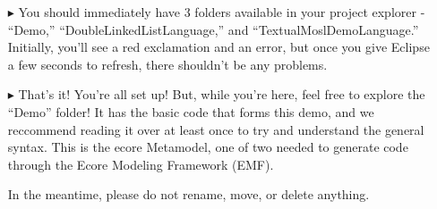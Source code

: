 \newpage
\texHeader

\begin{itemize}
\FloatBarrier
\item[$\blacktriangleright$] You should immediately have 3 folders available in your project explorer - ``Demo,'' ``DoubleLinkedListLanguage,'' and ``TextualMoslDemoLanguage.'' Initially, you'll see a red exclamation and an error, but once you give Eclipse a few seconds to refresh, there shouldn't be any problems.

\item[$\blacktriangleright$] That's it! You're all set up! But, while you're here, feel free to explore the ``Demo'' folder! It has the basic code that forms this demo, and we reccommend reading it over at least once to try and understand the general syntax. This is the ecore Metamodel, one of two needed to generate code through the Ecore Modeling Framework (EMF).

In the meantime, please do not rename, move, or delete anything.
\end{itemize}